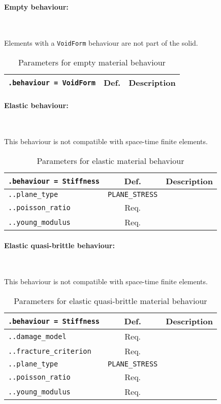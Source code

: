 \documentclass[10pt]{article}
\newcommand{\whiteline}{\textcolor{white}{.\\}}
\begin{document}
\paragraph{Empty behaviour:} \whiteline

Elements with a \verb+VoidForm+ behaviour are not part of the solid.

\begin{table}[h!]
\begin{tabularx}{\textwidth}{lcX}
\verb+.behaviour = VoidForm+ & Def. & Description \\
\hline
\end{tabularx}
\caption{Parameters for empty material behaviour}
\end{table}

\paragraph{Elastic behaviour:} \whiteline

This behaviour is not compatible with space-time finite elements.

\begin{table}[h!]
\begin{tabularx}{\textwidth}{lcX}
\verb+.behaviour = Stiffness+ & Def. & Description\\
\hline
\verb+..plane_type+ & \verb+PLANE_STRESS+ & \\
\verb+..poisson_ratio+ & Req. & \\
\verb+..young_modulus+ & Req. & \\
\hline
\end{tabularx}
\caption{Parameters for elastic material behaviour}
\end{table}

\paragraph{Elastic quasi-brittle behaviour:} \whiteline

This behaviour is not compatible with space-time finite elements.

\begin{table}[h!]
\begin{tabularx}{\textwidth}{lcX}
\verb+.behaviour = Stiffness+ & Def. & Description\\
\hline
\verb+..damage_model+ & Req.  & \\	
\verb+..fracture_criterion+ & Req.  & \\	
\verb+..plane_type+ & \verb+PLANE_STRESS+ & \\
\verb+..poisson_ratio+ & Req. & \\
\verb+..young_modulus+ & Req. & \\
\hline
\end{tabularx}
\caption{Parameters for elastic quasi-brittle material behaviour}
\end{table}
\end{document}
